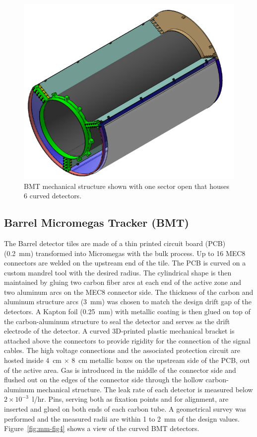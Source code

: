\begin{figure}[htb]
 \includegraphics[width=1.0\columnwidth,keepaspectratio]{images/fig3}
 \caption{BMT mechanical structure shown with one sector open that houses 6 curved detectors.}
 \label{fig:mm-fig3}
\end{figure}

\subsection{Barrel Micromegas Tracker (BMT)}

The Barrel detector tiles are made of a thin printed circuit board (PCB) (0.2~mm) transformed into Micromegas with the bulk
process. Up to 16 MEC8 connectors are welded on the upstream end of the tile. The PCB is curved on a custom mandrel tool
with the desired radius. The cylindrical shape is then maintained by gluing two carbon fiber arcs at each end of the active
zone and two aluminum arcs on the MEC8 connector side. The thickness of the carbon and aluminum structure arcs (3~mm)
was chosen to match the design drift gap of the detectors. A Kapton foil (0.25~mm) with metallic coating is then glued on top
of the carbon-aluminum structure to seal the detector and serves as the drift electrode of the detector. A curved 3D-printed
plastic mechanical bracket is attached above the connectors to provide rigidity for the connection of the signal cables. The high
voltage connections and the associated protection circuit are hosted inside 4~cm $\times$ 8~cm metallic boxes on the upstream side of
the PCB, out of the active area.  Gas is introduced in the middle of the connector side and flushed out on the edges of the connector side through the
hollow carbon-aluminum mechanical structure. The leak rate of each detector is measured below \(2\times10^{-3}\)~l/hr. Pins,
serving both as fixation points and for alignment, are inserted and glued on both ends of each carbon tube. A geometrical survey
was performed and the measured radii are within 1 to 2~mm of the design values. Figure~\ref{fig:mm-fig4} shows a view of the
curved BMT detectors.

